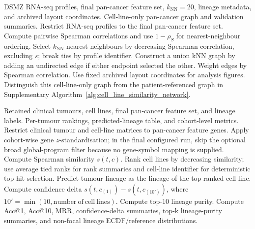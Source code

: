 \begin{algorithm}[H]
\caption{Pan-cancer cell-line transcriptomic similarity network}
\label{alg:supp_pan_cancer_cell_line_network}
\small
\begin{algorithmic}[1]
\Require DSMZ RNA-seq profiles, final pan-cancer feature set, \(k_{\mathrm{NN}}=20\), lineage metadata, and archived layout coordinates.
\Ensure Cell-line-only pan-cancer graph and validation summaries.
\State Restrict RNA-seq profiles to the final pan-cancer feature set.
\State Compute pairwise Spearman correlations and use \(1-\rho_S\) for nearest-neighbour ordering.
  \State Select \(k_{\mathrm{NN}}\) nearest neighbours by decreasing Spearman correlation, excluding \(s\); break ties by profile identifier.
\EndFor
\State Construct a union kNN graph by adding an undirected edge if either endpoint selected the other.
\State Weight edges by Spearman correlation.
\State Use fixed archived layout coordinates for analysis figures.
\State Distinguish this cell-line-only graph from the patient-referenced graph in Supplementary Algorithm~\ref{alg:cell_line_similarity_network}.
\end{algorithmic}
\end{algorithm}

\begin{algorithm}[H]
\caption{Tumour-to-cell-line transcriptomic mapping and classification}
\label{alg:supp_tumour_to_cell_line_mapping}
\small
\begin{algorithmic}[1]
\Require Retained clinical tumours, cell lines, final pan-cancer feature set, and lineage labels.
\Ensure Per-tumour rankings, predicted-lineage table, and cohort-level metrics.
\State Restrict clinical tumour and cell-line matrices to pan-cancer feature genes.
\State Apply cohort-wise gene \(z\)-standardisation; in the final configured run, skip the optional broad global-program filter because no gene-symbol mapping is supplied.
    \State Compute Spearman similarity \(s(t,c)\).
  \EndFor
  \State Rank cell lines by decreasing similarity; use average tied ranks for rank summaries and cell-line identifier for deterministic top-hit selection.
  \State Predict tumour lineage as the lineage of the top-ranked cell line.
  \State Compute confidence delta \(s(t,c_{(1)})-s(t,c_{(10')})\), where \(10'=\min(10,\mathrm{number\ of\ cell\ lines})\).
  \State Compute top-10 lineage purity.
\EndFor
\State Compute Acc@1, Acc@10, MRR, confidence-delta summaries, top-k lineage-purity summaries, and non-focal lineage ECDF/reference distributions.
\end{algorithmic}
\end{algorithm}

